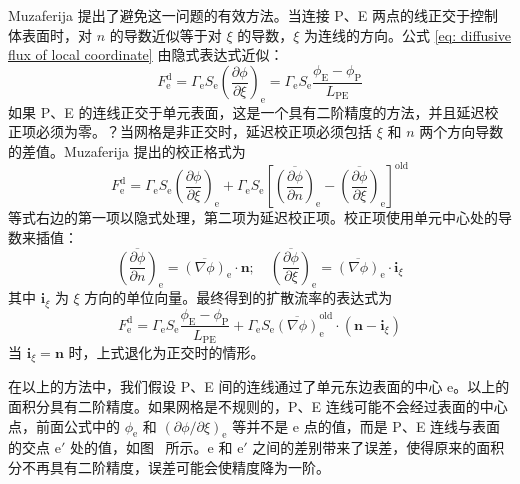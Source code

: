Muzaferija\cite{Muzaferija1994} 提出了避免这一问题的有效方法。当连接 P、E 两点的线正交于控制体表面时，对 $n$ 的导数近似等于对 $\xi$ 的导数，$\xi$ 为连线的方向。公式 \eqref{eq: diffusive flux of local coordinate} 由隐式表达式近似：
\begin{equation}
	F_{\mathrm{e}}^{\mathrm{d}} = \varGamma_{\mathrm{e}}S_{\mathrm{e}}\left(\frac{\partial\phi}{\partial\xi}\right)_{\mathrm{e}} = 
	\varGamma_{\mathrm{e}}S_{\mathrm{e}}\frac{\phi_{\mathrm{E}}-\phi_{\mathrm{P}}}{L_{\mathrm{PE}}}
\end{equation}
如果 P、E 的连线正交于单元表面，这是一个具有二阶精度的方法，并且延迟校正项必须为零。？当网格是非正交时，延迟校正项必须包括 $\xi$ 和 $n$ 两个方向导数的差值。Muzaferija\cite{Muzaferija1994} 提出的校正格式为
\begin{equation}\label{eq: Muzaferija1994 formula}
	F_{\mathrm{e}}^{\mathrm{d}} = \varGamma_{\mathrm{e}}S_{\mathrm{e}}\left(\frac{\partial\phi}{\partial\xi}\right)_{\mathrm{e}} +
	\varGamma_{\mathrm{e}}S_{\mathrm{e}}\left[ 
	\overline{\left(\frac{\partial\phi}{\partial n}\right)}_{\mathrm{e}} - 
	\overline{\left(\frac{\partial\phi}{\partial\xi}\right)}_{\mathrm{e}} \right]^{\mathrm{old}}
\end{equation}
等式右边的第一项以隐式处理，第二项为延迟校正项。校正项使用单元中心处的导数来插值：
\begin{equation}
	\overline{\left(\frac{\partial\phi}{\partial n}\right)}_{\mathrm{e}} =
	\overline{(\nabla\phi)}_{\mathrm{e}}\cdot\bm{n}; \quad
	\overline{\left(\frac{\partial\phi}{\partial\xi}\right)}_{\mathrm{e}} =
	\overline{(\nabla\phi)}_{\mathrm{e}}\cdot\bm{i}_{\xi}
\end{equation}
其中 $\bm{i}_{\xi}$ 为 $\xi$ 方向的单位向量。最终得到的扩散流率的表达式为
\begin{equation}
	F_{\mathrm{e}}^{\mathrm{d}} = \varGamma_{\mathrm{e}}S_{\mathrm{e}}\frac{\phi_{\mathrm{E}}-\phi_{\mathrm{P}}}{L_{\mathrm{PE}}} +
	\varGamma_{\mathrm{e}}S_{\mathrm{e}}\overline{(\nabla\phi)}_{\mathrm{e}}^{\mathrm{old}}\cdot(\bm{n}-\bm{i}_{\xi})
\end{equation}
当 $\bm{i}_{\xi}=\bm{n}$ 时，上式退化为正交时的情形。

在以上的方法中，我们假设 P、E 间的连线通过了单元东边表面的中心 e。以上的面积分具有二阶精度。如果网格是不规则的，P、E 连线可能不会经过表面的中心点，前面公式中的 $\phi_{\mathrm{e}}$ 和 $(\partial\phi/\partial\xi)_{\mathrm{e}}$ 等并不是 e 点的值，而是 P、E 连线与表面的交点 $\mathrm{e}'$ 处的值，如图~ 所示。e 和 $\mathrm{e}'$ 之间的差别带来了误差，使得原来的面积分不再具有二阶精度，误差可能会使精度降为一阶。

